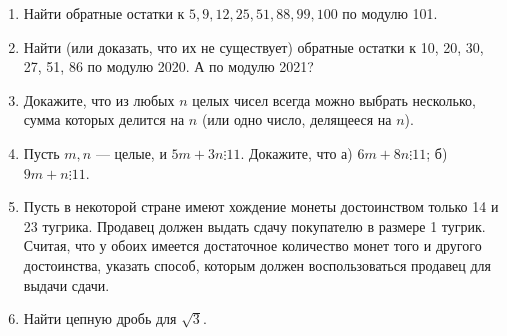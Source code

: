 \begin{enumerate}
\item Найти обратные остатки к $5,9,12,25,51,88,99,100$ по модулю 101.
\item Найти (или доказать, что их не существует) обратные остатки к 10, 20, 30, 27, 51, 86 по модулю 2020. А по модулю 2021?
\item Докажите, что из любых $n$ целых чисел всегда можно выбрать
несколько, сумма которых делится на $n$ (или одно число, делящееся
на $n$).
\item Пусть $m,n$ --- целые, и $5m+3n\vdots 11$. Докажите, что а) $6m+8n\vdots 11$; б) $9m+n\vdots 11$.
\item Пусть в некоторой стране имеют хождение монеты достоинством только 14 и 23 тугрика. Продавец должен выдать сдачу покупателю в размере 1 тугрик. Считая, что у обоих имеется достаточное количество монет того и другого достоинства, указать способ, которым должен воспользоваться продавец для выдачи сдачи.
\item Найти цепную дробь для $\sqrt 3$.


\end{enumerate}

